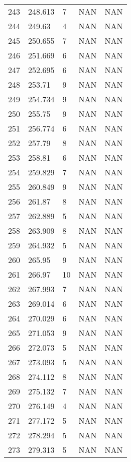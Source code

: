 \documentclass{article}
\begin{document}
\begin{longtable}{@{}lllll@{}}
				243 & 248.613 & 7     & NAN   & NAN   \\
				244 & 249.63  & 4     & NAN   & NAN   \\
				245 & 250.655 & 7     & NAN   & NAN   \\
				246 & 251.669 & 6     & NAN   & NAN   \\
				247 & 252.695 & 6     & NAN   & NAN   \\
				248 & 253.71  & 9     & NAN   & NAN   \\
				249 & 254.734 & 9     & NAN   & NAN   \\
				250 & 255.75  & 9     & NAN   & NAN   \\
				251 & 256.774 & 6     & NAN   & NAN   \\
				252 & 257.79  & 8     & NAN   & NAN   \\
				253 & 258.81  & 6     & NAN   & NAN   \\
				254 & 259.829 & 7     & NAN   & NAN   \\
				255 & 260.849 & 9     & NAN   & NAN   \\
				256 & 261.87  & 8     & NAN   & NAN   \\
				257 & 262.889 & 5     & NAN   & NAN   \\
				258 & 263.909 & 8     & NAN   & NAN   \\
				259 & 264.932 & 5     & NAN   & NAN   \\
				260 & 265.95  & 9     & NAN   & NAN   \\
				261 & 266.97  & 10    & NAN   & NAN   \\
				262 & 267.993 & 7     & NAN   & NAN   \\
				263 & 269.014 & 6     & NAN   & NAN   \\
				264 & 270.029 & 6     & NAN   & NAN   \\
				265 & 271.053 & 9     & NAN   & NAN   \\
				266 & 272.073 & 5     & NAN   & NAN   \\
				267 & 273.093 & 5     & NAN   & NAN   \\
				268 & 274.112 & 8     & NAN   & NAN   \\
				269 & 275.132 & 7     & NAN   & NAN   \\
				270 & 276.149 & 4     & NAN   & NAN   \\
				271 & 277.172 & 5     & NAN   & NAN   \\
				272 & 278.294 & 5     & NAN   & NAN   \\
				273 & 279.313 & 5     & NAN   & NAN   \\

\end{longtable}
\end{document}
